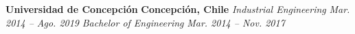 \item
\headerrow
{\textbf{Universidad de Concepción}}
{\textbf{Concepción, Chile}}
\headerrow
{\emph{Industrial Engineering}}
{\emph{Mar. 2014 -- Ago. 2019}}
\headerrow
{\emph{Bachelor of Engineering}}
{\emph{Mar. 2014 -- Nov. 2017}}